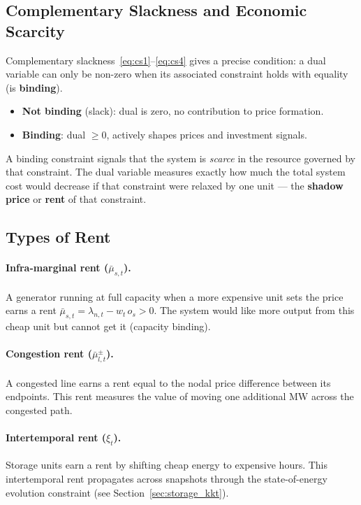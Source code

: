 \documentclass{article}
\begin{document}
\subsection{Complementary Slackness and Economic Scarcity}

Complementary slackness~\eqref{eq:cs1}--\eqref{eq:cs4} gives a precise
condition: a dual variable can only be non-zero when its associated
constraint holds with equality (is \textbf{binding}).

\begin{itemize}
    \item \textbf{Not binding} (slack): dual is zero, no contribution to price formation.
    \item \textbf{Binding}: dual $\ge 0$, actively shapes prices and investment signals.
\end{itemize}

A binding constraint signals that the system is \emph{scarce} in the
resource governed by that constraint. The dual variable measures exactly
how much the total system cost would decrease if that constraint were relaxed
by one unit --- the \textbf{shadow price} or \textbf{rent} of that constraint.

\subsection{Types of Rent}

\paragraph{Infra-marginal rent ($\bar{\mu}_{s,t}$).}
A generator running at full capacity when a more expensive unit sets the
price earns a rent $\bar{\mu}_{s,t} = \lambda_{n,t} - w_t\, o_s > 0$.
The system would like more output from this cheap unit but cannot get it
(capacity binding).

\paragraph{Congestion rent ($\bar{\mu}^{\pm}_{l,t}$).}
A congested line earns a rent equal to the nodal price difference between
its endpoints. This rent measures the value of moving one additional MW
across the congested path.

\paragraph{Intertemporal rent ($\xi_t$).}
Storage units earn a rent by shifting cheap energy to expensive hours.
This intertemporal rent propagates across snapshots through the state-of-energy
evolution constraint (see Section~\ref{sec:storage_kkt}).
\end{document}
